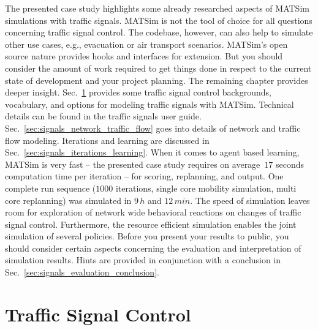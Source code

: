The presented case study highlights some already researched aspects of MATSim simulations with traffic signals. 
MATSim is not the tool of choice for all questions concerning traffic signal control. 
The codebase, however, can also help to simulate other use cases, e.g., evacuation or air transport scenarios. 
MATSim's open source nature provides hooks and interfaces for extension. 
But you should consider the amount of work required to get things done in respect to the current state of development and your project planning. 
The remaining chapter provides deeper insight.  
Sec.~\ref{sec:signals_traffic_signal_control} provides some traffic signal control backgrounds, vocabulary, and options for modeling traffic signals with MATSim. 
Technical details can be found in the traffic signals user guide.  
Sec.~\ref{sec:signals_network_traffic_flow} goes into details of network and traffic flow modeling. 
Iterations and learning are discussed in Sec.~\ref{sec:signals_iterations_learning}. 
When it comes to agent based learning, MATSim is very fast -- the presented case study requires on average~$17$ seconds computation time per iteration -- for scoring, replanning, and output. One complete run sequence ($1000$ iterations, single core mobility simulation, multi core replanning) was simulated in $9 \, h$ and $12 \, min$. 
The speed of simulation leaves room for exploration of network wide behavioral reactions on changes of traffic signal control. 
Furthermore, the resource efficient simulation enables the joint simulation of several policies. 
Before you present your results to public, you should consider certain aspects concerning the  evaluation and interpretation of simulation results. 
Hints are provided in conjunction with a conclusion in Sec.~\ref{sec:signals_evaluation_conclusion}. 


\section{Traffic Signal Control}
\label{sec:signals_traffic_signal_control}


